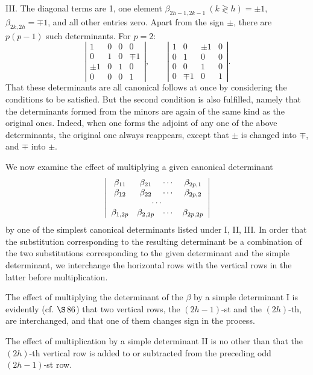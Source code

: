\documentclass[10pt]{article}
\begin{document}
III. The diagonal terms are 1, one element \(\beta_{2h-1,2k-1}\ (k\gtrless h)=\pm1\), \(\beta_{2k,2h}=\mp1\), and all other entries zero. Apart from the sign \(\pm\), there are \(p(p-1)\) such determinants. For \(p=2\):
\[
\left|\begin{array}{rrrr}1&0&0&0\\ 0&1&0&\mp1\\ \pm1&0&1&0\\ 0&0&0&1\end{array}\right|,
\qquad
\left|\begin{array}{rrrr}1&0&\pm1&0\\ 0&1&0&0\\ 0&0&1&0\\ 0&\mp1&0&1\end{array}\right|.
\]
That these determinants are all canonical follows at once by considering the conditions to be satisfied. But the second condition is also fulfilled, namely that the determinants formed from the minors are again of the same kind as the original ones. Indeed, when one forms the adjoint of any one of the above determinants, the original one always reappears, except that \(\pm\) is changed into \(\mp\), and \(\mp\) into \(\pm\).

We now examine the effect of multiplying a given canonical determinant
\[
\left|\begin{array}{cccc}
\beta_{11}&\beta_{21}&\cdots&\beta_{2p,1}\\
\beta_{12}&\beta_{22}&\cdots&\beta_{2p,2}\\
\multicolumn{4}{c}{\cdots}\\
\beta_{1,2p}&\beta_{2,2p}&\cdots&\beta_{2p,2p}
\end{array}\right|
\]
by one of the simplest canonical determinants listed under I, II, III. In order that the substitution corresponding to the resulting determinant be a combination of the two substitutions corresponding to the given determinant and the simple determinant, we interchange the horizontal rows with the vertical rows in the latter before multiplication.

The effect of multiplying the determinant of the \(\beta\) by a simple determinant I is evidently (cf. \(\S\,86\)) that two vertical rows, the \((2h-1)\)-st and the \((2h)\)-th, are interchanged, and that one of them changes sign in the process.

The effect of multiplication by a simple determinant II is no other than that the \((2h)\)-th vertical row is added to or subtracted from the preceding odd \((2h-1)\)-st row.
\end{document}
